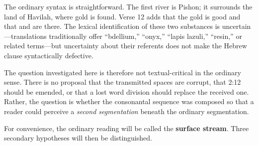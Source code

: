 
The ordinary syntax is straightforward.  The first river is Pishon; it surrounds the land of Havilah, where gold is found.  Verse 12 adds that the gold is good and that  and  are there.  The lexical identification of these two substances is uncertain---translations traditionally offer ``bdellium,'' ``onyx,'' ``lapis lazuli,'' ``resin,'' or related terms---but uncertainty about their referents does not make the Hebrew clause syntactically defective.\cite{BDB,Westermann1984}

The question investigated here is therefore not textual-critical in the ordinary sense.  There is no proposal that the transmitted spaces are corrupt, that 2:12 should be emended, or that a lost word division should replace the received one.  Rather, the question is whether the consonantal sequence was composed so that a reader could perceive a \emph{second segmentation} beneath the ordinary segmentation.

For convenience, the ordinary reading will be called the \textbf{surface stream}.  Three secondary hypotheses will then be distinguished.

